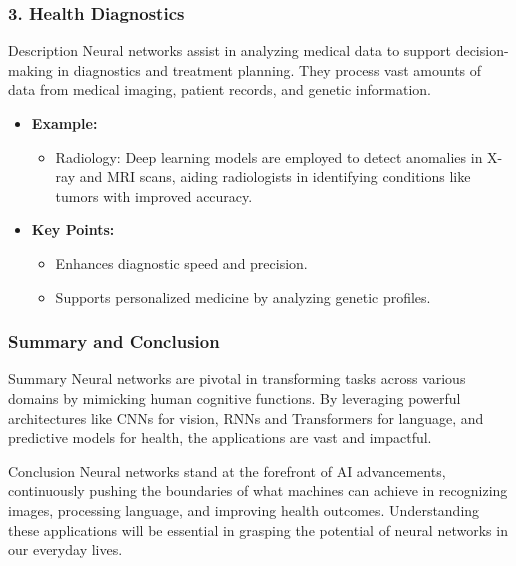 \documentclass[aspectratio=169]{beamer}
\begin{document}
\begin{frame}[fragile]
    \frametitle{3. Health Diagnostics}
    \begin{block}{Description}
        Neural networks assist in analyzing medical data to support decision-making in diagnostics and treatment planning. They process vast amounts of data from medical imaging, patient records, and genetic information.
    \end{block}

    \begin{itemize}
        \item \textbf{Example:}
        \begin{itemize}
            \item Radiology: Deep learning models are employed to detect anomalies in X-ray and MRI scans, aiding radiologists in identifying conditions like tumors with improved accuracy.
        \end{itemize}
        \item \textbf{Key Points:}
        \begin{itemize}
            \item Enhances diagnostic speed and precision.
            \item Supports personalized medicine by analyzing genetic profiles.
        \end{itemize}
    \end{itemize}
\end{frame}

\begin{frame}[fragile]
    \frametitle{Summary and Conclusion}
    \begin{block}{Summary}
        Neural networks are pivotal in transforming tasks across various domains by mimicking human cognitive functions. By leveraging powerful architectures like CNNs for vision, RNNs and Transformers for language, and predictive models for health, the applications are vast and impactful.
    \end{block}

    \begin{block}{Conclusion}
        Neural networks stand at the forefront of AI advancements, continuously pushing the boundaries of what machines can achieve in recognizing images, processing language, and improving health outcomes. Understanding these applications will be essential in grasping the potential of neural networks in our everyday lives.
    \end{block}
\end{frame}
\end{document}
